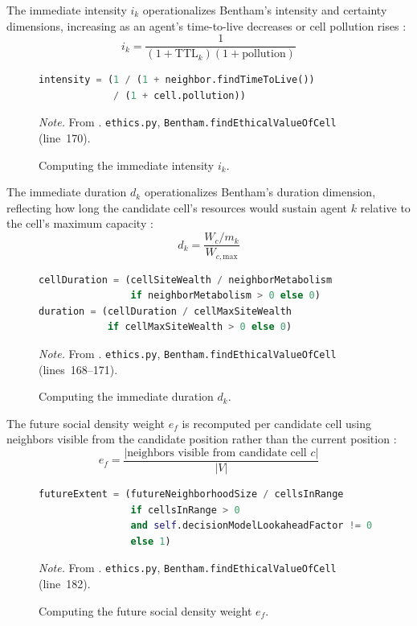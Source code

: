\documentclass{icsthesis}
\begin{document}
\begin{mainmatter}
The immediate intensity $i_k$ operationalizes Bentham's intensity and certainty dimensions, increasing as an agent's time-to-live decreases or cell pollution rises \citep{KremerHerman2024}:
\begin{equation}
	i_k = \frac{1}{(1 + \text{TTL}_k)(1 + \text{pollution})}
\end{equation}
\begin{figure}[H]
\caption{Computing the immediate intensity \(i_k\).}
\begin{lstlisting}[language=Python, firstnumber=170]
intensity = (1 / (1 + neighbor.findTimeToLive())
             / (1 + cell.pollution))
\end{lstlisting}
{\footnotesize\noindent\textit{Note.} From \citet{KremerHerman2024}. \texttt{ethics.py}, \texttt{Bentham.findEthicalValueOfCell} (line~170).}
\end{figure}

The immediate duration $d_k$ operationalizes Bentham's duration dimension, reflecting how long the candidate cell's resources would sustain agent $k$ relative to the cell's maximum capacity \citep{KremerHerman2024}:
\begin{equation}
	d_k = \frac{W_c / m_k}{W_{c,\mathrm{max}}}
\end{equation}
\begin{figure}[H]
\caption{Computing the immediate duration \(d_k\).}
\begin{lstlisting}[language=Python, firstnumber=168]
cellDuration = (cellSiteWealth / neighborMetabolism
                if neighborMetabolism > 0 else 0)
duration = (cellDuration / cellMaxSiteWealth
            if cellMaxSiteWealth > 0 else 0)
\end{lstlisting}
{\footnotesize\noindent\textit{Note.} From \citet{KremerHerman2024}. \texttt{ethics.py}, \texttt{Bentham.findEthicalValueOfCell} (lines~168--171).}
\end{figure}

The future social density weight $e_f$ is recomputed per candidate cell using neighbors visible from the candidate position rather than the current position \citep{KremerHerman2024}:
\begin{equation}
	e_f = \frac{|\text{neighbors visible from candidate cell } c|}{|V|}
\end{equation}
\begin{figure}[H]
\caption{Computing the future social density weight \(e_f\).}
\begin{lstlisting}[language=Python, firstnumber=182]
futureExtent = (futureNeighborhoodSize / cellsInRange
                if cellsInRange > 0
                and self.decisionModelLookaheadFactor != 0
                else 1)
\end{lstlisting}
{\footnotesize\noindent\textit{Note.} From \citet{KremerHerman2024}. \texttt{ethics.py}, \texttt{Bentham.findEthicalValueOfCell} (line~182).}
\end{figure}


\end{mainmatter}
\end{document}
